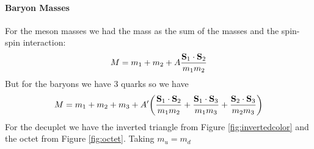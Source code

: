 \documentclass[../main.tex]{subfiles}
\begin{document}
\paragraph*{Baryon Masses} For the meson masses we had the mass as the sum of the masses and the
spin-spin interaction:
\begin{align*}
    M = m_1 + m_2 + A \frac{\vb S_1 \cdot \vb S_2}{m_1 m_2}
\end{align*}
But for the baryons we have 3 quarks so we have
\begin{align*}
    M = m_1 + m_2 + m_3 + A' \qt(\frac{\vb S_1 \cdot \vb S_2}{m_1 m_2} 
        + \frac{\vb S_1 \cdot \vb S_3}{m_1 m_3} 
        + \frac{\vb S_2 \cdot \vb S_3}{m_2 m_3})
\end{align*}
For the decuplet we have the inverted triangle from Figure \ref{fig:invertedcolor} and the octet 
from Figure \ref{fig:octet}. Taking $m_u = m_d$
\end{document}
